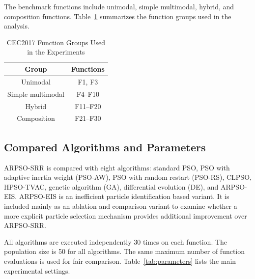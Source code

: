 \documentclass[conference]{IEEEtran}
\begin{document}
The benchmark functions include unimodal, simple multimodal, hybrid, and composition functions. Table~\ref{tab:function_groups} summarizes the function groups used in the analysis.

\begin{table}[!t]
\caption{CEC2017 Function Groups Used in the Experiments}
\centering
\begin{tabular}{cc}
\toprule
Group & Functions \\
\midrule
Unimodal & F1, F3 \\
Simple multimodal & F4--F10 \\
Hybrid & F11--F20 \\
Composition & F21--F30 \\
\bottomrule
\end{tabular}
\label{tab:function_groups}
\end{table}

\subsection{Compared Algorithms and Parameters}
ARPSO-SRR is compared with eight algorithms: standard PSO, PSO with adaptive inertia weight (PSO-AW), PSO with random restart (PSO-RS), CLPSO, HPSO-TVAC, genetic algorithm (GA), differential evolution (DE), and ARPSO-EIS. ARPSO-EIS is an inefficient particle identification based variant. It is included mainly as an ablation and comparison variant to examine whether a more explicit particle selection mechanism provides additional improvement over ARPSO-SRR.

All algorithms are executed independently 30 times on each function. The population size is 50 for all algorithms. The same maximum number of function evaluations is used for fair comparison. Table~\ref{tab:parameters} lists the main experimental settings.
\end{document}
